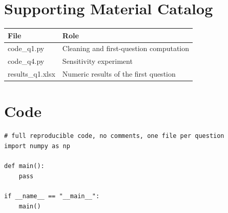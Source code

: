\documentclass[12pt,letterpaper]{article}
\begin{document}
\newpage
\label{appendix:start}
\begin{appendices}

\section{Supporting Material Catalog}
\begin{table}[H]
\centering
\begin{tabular}{ll}
\toprule
File & Role \\
\midrule
code\_q1.py & Cleaning and first-question computation \\
code\_q4.py & Sensitivity experiment \\
results\_q1.xlsx & Numeric results of the first question \\
\bottomrule
\end{tabular}
\end{table}

\section{Code}
\begin{lstlisting}
# full reproducible code, no comments, one file per question
import numpy as np

def main():
    pass

if __name__ == "__main__":
    main()
\end{lstlisting}

\end{appendices}
\label{paper:end}
\end{document}
